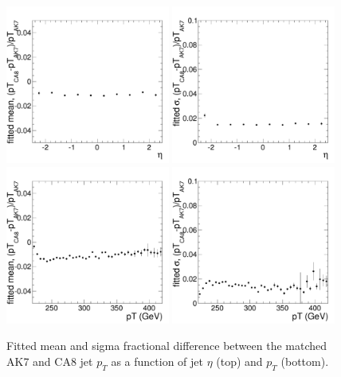 \begin{figure}[htbp]
\centering
\includegraphics[width=0.48\textwidth]{figs/diff_CA8vAK7_vEta_mean}
\includegraphics[width=0.48\textwidth]{figs/diff_CA8vAK7_vEta_sigma}\\
\includegraphics[width=0.48\textwidth]{figs/diff_CA8vAK7_vPt_mean}
\includegraphics[width=0.48\textwidth]{figs/diff_CA8vAK7_vPt_sigma}\\
\caption{Fitted mean and sigma fractional difference between the matched AK7 and CA8 jet $p_T$ as a function of jet $\eta$ (top) and $p_T$ (bottom).}
\label{fig:CA8vAK7}
\end{figure}

